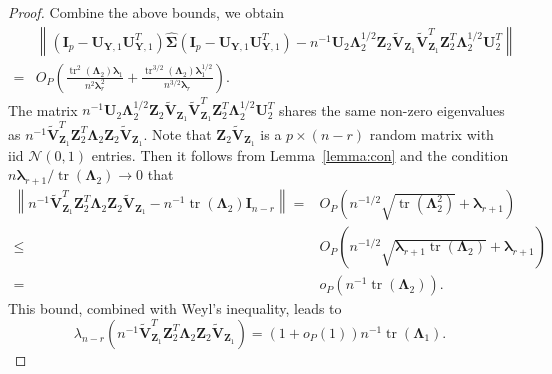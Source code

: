 \documentclass[12pt]{article} %
\DeclareMathOperator{\mytr}{tr}
\newcommand{\bZ}{\mathbf{Z}}
\newcommand{\bY}{\mathbf{Y}}
\newcommand{\bI}{\mathbf{I}}
\newcommand{\bU}{\mathbf{U}}
\newcommand{\bV}{\mathbf{V}}
\newcommand{\bfsym}[1]{\ensuremath{\boldsymbol{#1}}}
\def\blambda {\bfsym {\lambda}}
\def\bLambda {\bfsym {\Lambda}}
\def\bSigma {\bfsym {\Sigma}}
\theoremstyle{definition}
\begin{document}
\begin{appendices}
\begin{proof}
    Combine the above bounds, we obtain
    \begin{equation}\label{haoqilai1}
        \begin{split}
             &\left\|(\bI_p -\bU_{\bY,1}\bU_{\bY,1}^T)\hat{\bSigma}(\bI_p -\bU_{\bY,1}\bU_{\bY,1}^T)
             -
         n^{-1}\bU_2 \bLambda_2^{1/2} \bZ_2 \tilde{\bV}_{\bZ_1}\tilde{\bV}_{\bZ_1}^T  \bZ_2^T \bLambda_2^{1/2} \bU_2^T
             \right\|
             \\
             =&
             O_P\left(
                    \frac{\mytr^2(\bLambda_2)\blambda_1}{n^2 \blambda_r^2}
                 +
                 \frac{\mytr^{3/2}(\bLambda_2)\blambda_1^{1/2}}{n^{3/2}\blambda_r}
                \right).
        \end{split}
    \end{equation}
    The matrix $n^{-1}\bU_2 \bLambda_2^{1/2} \bZ_2 \tilde{\bV}_{\bZ_1}\tilde{\bV}_{\bZ_1}^T  \bZ_2^T \bLambda_2^{1/2} \bU_2^T$ shares the same non-zero eigenvalues as $n^{-1} \tilde{\bV}_{\bZ_1}^T\bZ_2^T\bLambda_2 \bZ_2 \tilde{\bV}_{\bZ_1}$.
    Note that $\bZ_{2}\tilde{\bV}_{\bZ_1}$ is a $p\times (n-r)$ random matrix with iid $\mathcal{N}(0,1)$ entries.
    Then it follows from Lemma~\ref{lemma:con} and the condition $n\blambda_{r+1}/\mytr(\bLambda_2)\to 0$ that
    \begin{equation}\label{choc8}
        \begin{split}
        \left\|
        n^{-1} \tilde{\bV}_{\bZ_1}^T\bZ_2^T\bLambda_2 \bZ_2 \tilde{\bV}_{\bZ_1}-n^{-1}\mytr(\bLambda_2)\bI_{n-r}
        \right\|
        =&O_P\left(n^{-1/2}\sqrt{\mytr(\bLambda_2^2)}+\blambda_{r+1}\right)
        \\
        \leq &
        O_P\left(n^{-1/2}\sqrt{\blambda_{r+1}\mytr(\bLambda_2)}+\blambda_{r+1}\right)
        \\
        =& o_P\left(n^{-1}\mytr(\bLambda_2)\right).
        \end{split}
    \end{equation}
    This bound, combined with Weyl's inequality, leads to
    \begin{equation}\label{haoqilai2}
        \lambda_{n-r}\left(
            n^{-1} \tilde{\bV}_{\bZ_1}^T\bZ_2^T\bLambda_2 \bZ_2 \tilde{\bV}_{\bZ_1}   
        \right)
        =(1+o_P(1))n^{-1}\mytr(\bLambda_1).
    \end{equation}

\end{proof}
\end{appendices}
\end{document}
